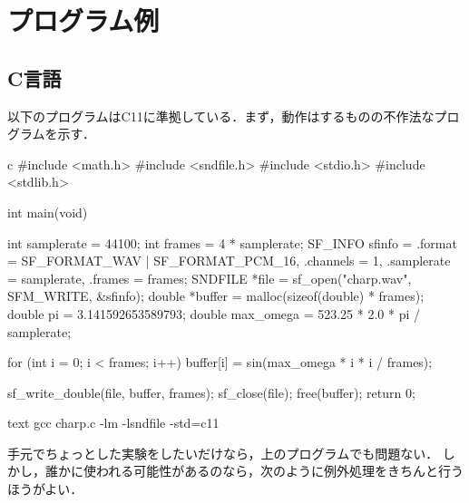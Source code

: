 \documentclass[../../main]{subfiles}
\begin{document}
\chapter{プログラム例}
\section{C言語}
以下のプログラムはC11に準拠している．まず，動作はするものの不作法なプログラムを示す．

\begin{codeblock}{c}
#include <math.h>
#include <sndfile.h>
#include <stdio.h>
#include <stdlib.h>

int main(void) {
  int samplerate = 44100;
  int frames = 4 * samplerate;
  SF_INFO sfinfo = {.format = SF_FORMAT_WAV | SF_FORMAT_PCM_16,
                    .channels = 1,
                    .samplerate = samplerate,
                    .frames = frames};
  SNDFILE *file = sf_open("charp.wav", SFM_WRITE, &sfinfo);
  double *buffer = malloc(sizeof(double) * frames);
  double pi = 3.141592653589793;
  double max_omega = 523.25 * 2.0 * pi / samplerate;

  for (int i = 0; i < frames; i++) {
    buffer[i] = sin(max_omega * i * i / frames);
  }

  sf_write_double(file, buffer, frames);
  sf_close(file);
  free(buffer);
  return 0;
}
\end{codeblock}

\begin{codeblock}{text}
gcc charp.c -lm -lsndfile -std=c11
\end{codeblock}

手元でちょっとした実験をしたいだけなら，上のプログラムでも問題ない．
しかし，誰かに使われる可能性があるのなら，次のように例外処理をきちんと行うほうがよい．
\end{document}
